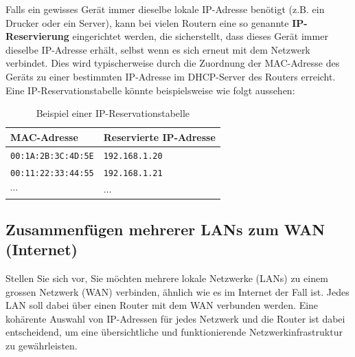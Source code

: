 \begin{myremark}\label{remark:ip-reservation}
	Falls ein gewisses Gerät immer dieselbe lokale \gls{IP}-Adresse benötigt (z.B. ein Drucker oder ein Server), kann bei vielen Routern eine so genannte \textbf{\gls{IP}-Reservierung} eingerichtet werden, die sicherstellt, dass dieses Gerät immer dieselbe \gls{IP}-Adresse erhält, selbst wenn es sich erneut mit dem Netzwerk verbindet. Dies wird typischerweise durch die Zuordnung der \gls{MAC}-Adresse des Geräts zu einer bestimmten \gls{IP}-Adresse im \gls{DHCP}-Server des Routers erreicht. Eine \gls{IP}-Reservationstabelle könnte beispielsweise wie folgt aussehen:
	\begin{table}[H]
		\centering
		\begin{tabular}{ll}
			\textbf{\gls{MAC}-Adresse}        & \textbf{Reservierte \gls{IP}-Adresse} \\\midrule
			\texttt{00:1A:2B:3C:4D:5E}           & \texttt{192.168.1.20} \\\midrule
			\texttt{00:11:22:33:44:55}           & \texttt{192.168.1.21} \\\midrule
			$\cdots$					 & $\dots$       \\
		\end{tabular}
		\caption{Beispiel einer \gls{IP}-Reservationstabelle}
	\end{table}
\end{myremark}

\subsection{\texorpdfstring{Zusammenfügen mehrerer \glspl{LAN} zum \gls{WAN} (Internet)}{Zusammenfügen mehrerer LANs zum WAN (Internet)}}
Stellen Sie sich vor, Sie möchten mehrere lokale Netzwerke (\glspl{LAN}) zu einem grossen Netzwerk (\gls{WAN}) verbinden, ähnlich wie es im Internet der Fall ist. Jedes \gls{LAN} soll dabei über einen Router mit dem \gls{WAN} verbunden werden. Eine kohärente Auswahl von \gls{IP}-Adressen für jedes Netzwerk und die Router ist dabei entscheidend, um eine übersichtliche und funktionierende Netzwerkinfrastruktur zu gewährleisten.


